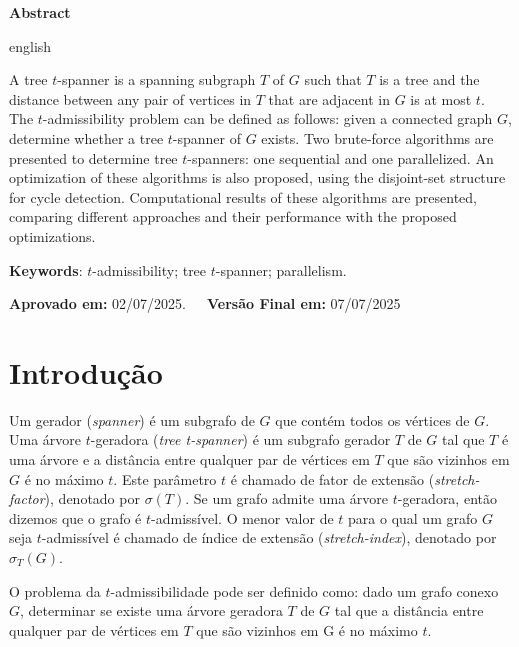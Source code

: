 \documentclass[article,a4paper,12pt,brazil,sumario=tradicional]{abntex2}
\theoremstyle{definition} %
\begin{document}
\begin{center}
    \textbf{Abstract}
\end{center}

\vspace{-.3cm}
\begin{hyphenrules}{english}

\noindent A tree $t$-spanner is a spanning subgraph $T$ of $G$ such that $T$ is a tree and the distance between any pair of vertices in $T$ that are adjacent in $G$ is at most $t$. The $t$-admissibility problem can be defined as follows: given a connected graph $G$, determine whether a tree $t$-spanner of $G$ exists. Two brute-force algorithms are presented to determine tree $t$-spanners: one sequential and one parallelized. An optimization of these algorithms is also proposed, using the disjoint-set structure for cycle detection. Computational results of these algorithms are presented, comparing different approaches and their performance with the proposed optimizations.

\end{hyphenrules}
\vspace{.4cm}

\noindent \textbf{Keywords}: $t$-admissibility; tree $t$-spanner; parallelism.

\vspace{.4cm}

\noindent \textbf{Aprovado em:} 02/07/2025.~~~\textbf{Versão Final em:} 07/07/2025

\section{Introdução}

Um gerador (\textit{spanner}) é um subgrafo de $G$ que contém todos os vértices de $G$. Uma árvore $t$-geradora (\textit{tree t-spanner}) é um subgrafo gerador $T$ de $G$ tal que $T$ é uma árvore e a distância entre qualquer par de vértices em $T$ que são vizinhos em $G$ é no máximo $t$. Este parâmetro $t$ é chamado de fator de extensão (\textit{stretch-factor}), denotado por $\sigma(T)$. Se um grafo admite uma árvore $t$-geradora, então dizemos que o grafo é $t$-admissível. O menor valor de $t$ para o qual um grafo $G$ seja $t$-admissível é chamado de índice de extensão (\textit{stretch-index}), denotado por $\sigma_T(G)$.

O problema da $t$-admissibilidade pode ser definido como: dado um grafo conexo $G$, determinar se existe uma árvore geradora $T$ de $G$ tal que a distância entre qualquer par de vértices em $T$ que são vizinhos em G é no máximo $t$.
\end{document}

